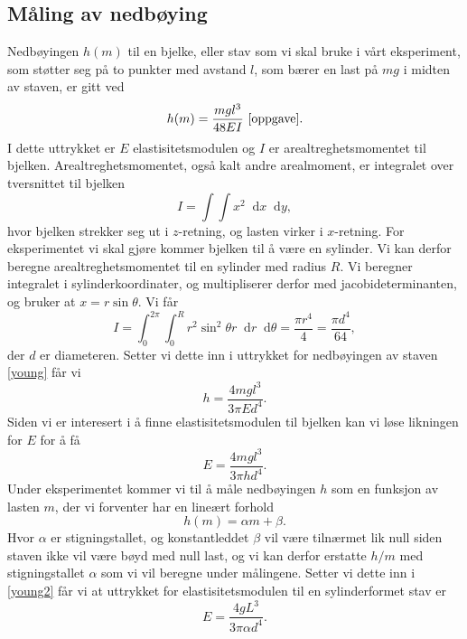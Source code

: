 \documentclass[%
 reprint,
 amsmath,amssymb,
 aps,
 norsk,
 booktabs
]{revtex4-1}
\newcommand*\diff{\mathop{}\!\mathrm{d}}
\begin{document}
\subsection{Måling av nedbøying}
Nedbøyingen $h(m)$ til en bjelke, eller stav som vi skal bruke i vårt eksperiment, som støtter seg på to punkter med avstand $l$, som bærer en last på $mg$ i midten av staven, er gitt ved
\begin{equation}
  h(m) = \frac{mgl^3}{48EI} \,\,\label{young} \cite{oppgave}.
\end{equation}
I dette uttrykket er $E$ elastisitetsmodulen og $I$ er arealtreghetsmomentet til bjelken. Arealtreghetsmomentet, også kalt andre arealmoment, er integralet over tversnittet til bjelken
\begin{equation*}
  I = \int\int x^2 \diff x \diff y,
\end{equation*}hvor bjelken strekker seg ut i $z$-retning, og lasten virker i $x$-retning. For eksperimentet vi skal gjøre kommer bjelken til å være en sylinder. Vi kan derfor beregne arealtreghetsmomentet til en sylinder med radius $R$. Vi beregner integralet i sylinderkoordinater, og multipliserer derfor med jacobideterminanten, og bruker at $x = r\sin{\theta}$. Vi får
\begin{equation*}
  I = \int_0^{2\pi} \int_0^R r^2\sin^2{\theta}r \diff r \diff \theta = \frac{\pi r^4}{4} = \frac{\pi d^4}{64},
\end{equation*}
der $d$ er diameteren. Setter vi dette inn i  uttrykket for nedbøyingen av staven \eqref{young} får vi
\begin{equation*}
  h = \frac{4mgl^3}{3\pi Ed^4}.
\end{equation*}
Siden vi er interesert i å finne elastisitetsmodulen til bjelken kan vi løse likningen for $E$ for å få
\begin{equation}
  E = \frac{4mgl^3}{3\pi hd^4}. \label{young2}
\end{equation}
Under eksperimentet kommer vi til å måle nedbøyingen $h$ som en funksjon av lasten $m$, der vi forventer har en lineært forhold
\begin{equation*}
  h(m) = \alpha m + \beta.
\end{equation*}
Hvor $\alpha$ er stigningstallet, og konstantleddet $\beta$ vil være tilnærmet lik null siden staven ikke vil være bøyd med null last, og vi kan derfor erstatte $h/m$ med stigningstallet $\alpha$ som vi vil beregne under målingene. Setter vi dette inn i \eqref{young2} får vi at uttrykket for elastisitetsmodulen til en sylinderformet stav er
\begin{equation}
  E = \frac{4gL^3}{3\pi \alpha d^4}. \label{young3}
\end{equation}
\end{document}
